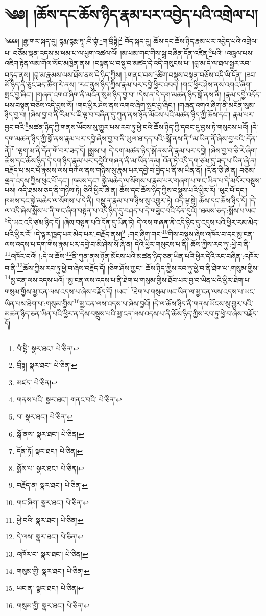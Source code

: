 \setcounter{footnote}{0} 
\chapter{༄༅། །ཆོས་དང་ཆོས་ཉིད་རྣམ་པར་འབྱེད་པའི་འགྲེལ་པ།}༄༅༅། །རྒྱ་གར་སྐད་དུ། དྷརྨ་དྷརྨ་ཏཱ་:བི་བྷཾ་\footnote{བཾ་བྷི་  སྣར་ཐང་།  པེ་ཅིན། }ག་བྲྀཏྟི།\footnote{བྲྀཏྟ།  སྣར་ཐང་།  པེ་ཅིན། } བོད་སྐད་དུ། ཆོས་དང་ཆོས་ཉིད་རྣམ་པར་འབྱེད་པའི་འགྲེལ་པ། བཅོམ་ལྡན་འདས་མ་ཕམ་པ་ལ་ཕྱག་འཚལ་ལོ། །མ་ཕམ་གང་གིས་སྒྲ་བཞིན་དོན་འཛིན་\footnote{མཛད་  པེ་ཅིན། }པའི། །འཁྲུལ་པས་འཇིག་རྟེན་ལམ་གོལ་སོང་མཁྱེན་ནས། །བསྟན་པ་བསྡུ་བ་མཛད་དེ་འདི་གསུངས་པ། །བླ་མ་དེ་ལ་ཐལ་སྦྱར་རབ་བཏུད་ནས། །བླ་མ་རྣམས་ལས་ཐོས་ནས་དེ་ཉིད་ཀྱིས། །:གནང་བས་\footnote{གནས་པའི་  སྣར་ཐང་། གནང་བའི་  པེ་ཅིན། }ཚིག་བསྡུས་བསྟན་བཅོས་འདི་ཡི་དོན། །ཟབ་མོ་ཉིད་ནི་ཅུང་ཟད་ཚིག་རེ་ནས། །རང་ནུས་ཉིད་ཀྱིས་རྣམ་པར་དབྱེ་ཕྱིར་འབད། །གང་ཕྱིར་ཤེས་ནས་འགའ་ཞིག་སྤང་བྱ་ཞིང་། །གཞན་འགའ་ཞིག་ནི་མངོན་སུམ་ཉིད་བྱ་བ། །དེས་ན་དེ་དག་མཚན་ཉིད་སྒོ་ནས་ནི། །རྣམ་དབྱེ་འདོད་པས་བསྟན་བཅོས་འདི་བྱས་སོ། །གང་ཕྱིར་ཤེས་ནས་འགའ་ཞིག་སྤང་བྱ་ཞིང་། །གཞན་འགའ་ཞིག་ནི་མངོན་སུམ་ཉིད་བྱ་བ། །ཞེས་བྱ་བ་ནི་རིམ་པ་ཇི་ལྟ་བ་བཞིན་དུ་ཀུན་ནས་ཉོན་མོངས་པའི་མཚན་ཉིད་ཀྱི་ཆོས་དང་། རྣམ་པར་བྱང་བའི་\footnote{བ་  སྣར་ཐང་།  པེ་ཅིན། }མཚན་ཉིད་ཀྱི་གནས་ཡོངས་སུ་གྱུར་པས་རབ་ཏུ་ཕྱེ་བའི་ཆོས་ཉིད་ཀྱི་དབང་དུ་བྱས་ཏེ་གསུངས་པའོ། །དེ་དག་མཚན་ཉིད་ཀྱི་སྒོ་ནས་རྣམ་པར་དབྱེ་ཞེས་བྱ་བ་ནི་ཡུལ་ཐ་དད་པའི་:སྒོ་ནས་ནི་\footnote{སྒོ་ནས་  སྣར་ཐང་།  པེ་ཅིན། }མ་ཡིན་ནོ་ཞེས་བྱ་བའི་:དོན་ནོ།\footnote{དོན་ཏོ།  སྣར་ཐང་།  པེ་ཅིན། } །ལྷག་མ་ནི་དོན་གོ་བར་ཟད་དོ། །སྨྲས་པ། དེ་དག་མཚན་ཉིད་སྒོ་ནས་ནི་རྣམ་པར་དབྱེ། །ཞེས་བྱ་བ་ཅི་རེ་ཞིག་ཆོས་དང་ཆོས་ཉིད་དེ་དག་ཉིད་རྣམ་པར་དབྱེའི་གཞན་ནི་མ་ཡིན་ནམ། འོན་ཏེ་འདི་དག་ཙམ་དུ་ཟད་པ་ཡིན་ཞེ་ན། བརྗོད་པ་མང་པོ་རྣམས་ལས་བཀོལ་ནས་གཉིས་སུ་རྣམ་པར་དབྱེ་བ་བྱེད་པ་ནི་མ་ཡིན་ནོ། །འོ་ན་ཅི་ཞེ་ན། བཅོམ་ལྡན་འདས་ཀྱིས་ཕུང་པོ་དང་། ཁམས་དང་། སྐྱེ་མཆེད་ལ་སོགས་པ་རྣམ་པར་གཞག་པ་གང་ཡིན་པ་དེ་མདོར་བསྡུས་པས། འདི་ཐམས་ཅད་ནི་གཉིས་ཏེ། ཅིའི་ཕྱིར་ཞེ་ན། ཆོས་དང་ཆོས་ཉིད་ཀྱིས་བསྡུས་པའི་ཕྱིར་རོ། །ཕུང་པོ་དང་། ཁམས་དང་སྐྱེ་མཆེད་ལ་སོགས་པ་དེ་ནི། བསྡུ་ན་རྣམ་པ་གཉིས་སུ་འགྱུར་ཏེ། འདི་ལྟ་སྟེ། ཆོས་དང་ཆོས་ཉིད་དོ། །དེ་ལ་འདི་ཞེས་སྨོས་པ་ནི་གང་ཞིག་བསྟན་པ་འདི་ཉིད་དུ་བཤད་པ་དེ་གཟུང་བའི་དོན་དུའོ། །ཐམས་ཅད་:སྨོས་པ་ཡང་\footnote{སྨོས་པ་  སྣར་ཐང་།  པེ་ཅིན། }དེ་ཡང་འདི་ཙམ་ཉིད་དོ། །ཞེས་བསྟན་པའི་དོན་དུ་ཡིན་ཏེ། དེ་ལས་གཞན་ནི་འདི་ཉིད་དུ་འདུས་པའི་ཕྱིར་རམ་མེད་པའི་ཕྱིར་རོ། །དེ་ལྟར་ཁྱད་པར་མེད་པར་:བརྗོད་ནས།\footnote{བརྗོད་ན།  སྣར་ཐང་།  པེ་ཅིན། } :གང་ཞིག་གང་\footnote{གང་ཞིག་  སྣར་ཐང་།  པེ་ཅིན། }གིས་བསྡུས་ཞེས་འཁོར་བ་དང་མྱ་ངན་ལས་འདས་པ་དག་གིས་རྣམ་པར་དབྱེ་བ་མི་ཤེས་སོ་ཞེ་ན། དེའི་ཕྱིར་གསུངས་པ་ནི། ཆོས་ཀྱིས་རབ་ཏུ་:ཕྱེ་བ་ནི་\footnote{ཕྱེ་བའི་  སྣར་ཐང་།  པེ་ཅིན། }འཁོར་བའོ། །:དེ་ལ་ཆོས་\footnote{དེ་ལས་  སྣར་ཐང་།  པེ་ཅིན། }ནི་ཀུན་ནས་ཉོན་མོངས་པའི་མཚན་ཉིད་ཅན་ཡིན་པའི་ཕྱིར་དེའི་རང་བཞིན་:འཁོར་བ་ནི་\footnote{འཁོར་བ་  སྣར་ཐང་།  པེ་ཅིན། }ཆོས་ཀྱིས་རབ་ཏུ་ཕྱེ་བ་ཞེས་བརྗོད་དོ། །ཅིག་ཤོས་ཀྱང་། ཆོས་ཉིད་ཀྱིས་རབ་ཏུ་ཕྱེ་བ་ནི་ཐེག་པ་:གསུམ་གྱིས་\footnote{གསུམ་གྱི་  སྣར་ཐང་།  པེ་ཅིན། }མྱ་ངན་ལས་འདས་པའོ། །མྱ་ངན་ལས་འདས་པ་ནི་ཐེག་པ་གསུམ་གྱིས་ཐོབ་པར་བྱ་བ་ཡིན་པའི་ཕྱིར་ཐེག་པ་གསུམ་གྱིས་མྱ་ངན་ལས་འདས་པ་ཞེས་བརྗོད་དོ། །ཡང་\footnote{ཡང་ན་  སྣར་ཐང་།  པེ་ཅིན། }ཐེག་པ་གསུམ་ཡང་ཡིན་ལ་མྱ་ངན་ལས་འདས་པ་ཡང་ཡིན་པས་ཐེག་པ་:གསུམ་གྱིས་\footnote{གསུམ་གྱི་  སྣར་ཐང་།  པེ་ཅིན། }མྱ་ངན་ལས་འདས་པ་ཞེས་བྱའོ། །དེ་ལ་ཆོས་ཉིད་ནི་གནས་ཡོངས་སུ་གྱུར་པའི་མཚན་ཉིད་ཅན་ཡིན་པའི་ཕྱིར་ན་དེས་བསྡུས་པའི་མྱ་ངན་ལས་འདས་པ་ནི་ཆོས་ཉིད་ཀྱིས་རབ་ཏུ་ཕྱེ་བ་ཞེས་བརྗོད་དོ། 